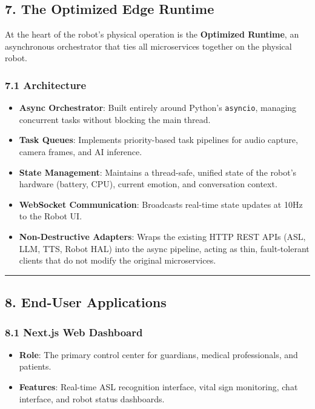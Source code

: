 \documentclass[
]{article}
\providecommand{\tightlist}{%
  \setlength{\itemsep}{0pt}\setlength{\parskip}{0pt}}
\begin{document}
\subsection{7. The Optimized Edge
Runtime}\label{the-optimized-edge-runtime}

At the heart of the robot's physical operation is the \textbf{Optimized
Runtime}, an asynchronous orchestrator that ties all microservices
together on the physical robot.

\subsubsection{7.1 Architecture}\label{architecture-1}

\begin{itemize}
\tightlist
\item
  \textbf{Async Orchestrator}: Built entirely around Python's
  \texttt{asyncio}, managing concurrent tasks without blocking the main
  thread.
\item
  \textbf{Task Queues}: Implements priority-based task pipelines for
  audio capture, camera frames, and AI inference.
\item
  \textbf{State Management}: Maintains a thread-safe, unified state of
  the robot's hardware (battery, CPU), current emotion, and conversation
  context.
\item
  \textbf{WebSocket Communication}: Broadcasts real-time state updates
  at 10Hz to the Robot UI.
\item
  \textbf{Non-Destructive Adapters}: Wraps the existing HTTP REST APIs
  (ASL, LLM, TTS, Robot HAL) into the async pipeline, acting as thin,
  fault-tolerant clients that do not modify the original microservices.
\end{itemize}

\begin{center}\rule{0.5\linewidth}{0.5pt}\end{center}

\subsection{8. End-User Applications}\label{end-user-applications}

\subsubsection{8.1 Next.js Web Dashboard}\label{next.js-web-dashboard}

\begin{itemize}
\tightlist
\item
  \textbf{Role}: The primary control center for guardians, medical
  professionals, and patients.
\item
  \textbf{Features}: Real-time ASL recognition interface, vital sign
  monitoring, chat interface, and robot status dashboards.
\end{itemize}
\end{document}
